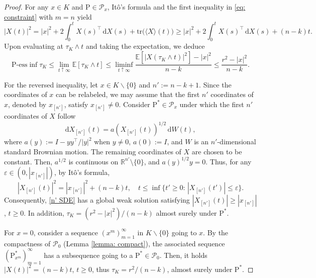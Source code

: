 \documentclass[11pt]{amsart}
\numberwithin{equation}{section}
\begin{document}
\begin{proof}
For any $x\in K$ and $\mathrm{P}\in\mathcal{P}_x$, Itô's formula and the first inequality in \eqref{eq: constraint} with $m=n$ yield
\[
|X(t)|^2 = |x|^2 + 2\int_0^t X(s)^{\top}\,\mathrm{d}X(s) + \text{tr}\big(\langle X\rangle(t)\big) 
\geq |x|^2 + 2\int_0^t X(s)^{\top}\,\mathrm{d}X(s) + (n-k)t.
\]
Upon evaluating at $\tau_K\wedge t$ and taking the expectation, we deduce
\begin{equation}
\mathrm{P}\text{-ess} \inf \tau_K
\le \lim_{t\uparrow\infty} \mathbb{E}[\tau_K\wedge t] 
\le \liminf_{t\uparrow\infty} \frac{\mathbb{E}[|X(\tau_K\wedge t)|^2] - |x|^2}{n-k} 
\le \frac{r^2 - |x|^2}{n-k}.
\end{equation}

\smallskip

For the reversed inequality, let $x\in K\backslash\{0\}$ and $n' := n-k+1$. Since the coordinates of $x$ can be relabeled, we may assume that the first $n'$ coordinates of $x$, denoted by $x_{[n']}$, satisfy $x_{[n']}\neq0$. Consider $\mathrm{P}^{\ast}\in\mathcal{P}_x$ under which the first $n'$ coordinates of $X$ follow
\begin{equation}\label{n' SDE}
\mathrm{d}X_{[n']}(t) = a(X_{[n']}(t))^{1/2}\,\mathrm{d}{W(t)},
\end{equation}
where $a(y) := I - yy^{\top}/|y|^2$ when $y\neq 0$, $a(0):=I$, and $W$ is an $n'$-dimensional standard Brownian motion. The remaining coordinates of $X$ are chosen to be constant. Then, $a^{1/2}$ is continuous on ${\mathbb R}^{n'} \setminus \{0\}$, and $a(y)^{1/2}y = 0$. Thus, for any $\varepsilon\in(0,|x_{[n']}|)$, by Itô's formula,
\[
|X_{[n']}(t)|^2 = |x_{[n']}|^2 + (n-k)t,\quad t\le\inf\big\{t'\ge0:\,|X_{[n']}(t')|\le\varepsilon\big\}.
\]
Consequently, \eqref{n' SDE} has a global weak solution satisfying $|X_{[n']}(t)|\ge|x_{[n']}|$, $t\ge0$. In addition, $\tau_K = (r^2 - |x|^2) / (n-k)$ almost surely under $\mathrm{P}^{\ast}$.

\medskip
%

For $x=0$, consider a sequence $(x^m)_{m=1}^\infty$ in $K\backslash\{0\}$ going to $x$. By the compactness of $\mathcal{P}_0$ (Lemma \ref{lemma: compact}), the associated sequence $(\mathrm{P}^{\ast}_{x^m})_{m=1}^\infty$ has a subsequence going to a $\mathrm{P}^{\ast}\in\mathcal{P}_0$. Then, it holds $|X(t)|^2 = (n-k) t$, $t \geq 0$, thus $\tau_K = r^2 / (n-k)$, almost surely under $\mathrm{P}^{\ast}$.
\end{proof}
\end{document}
